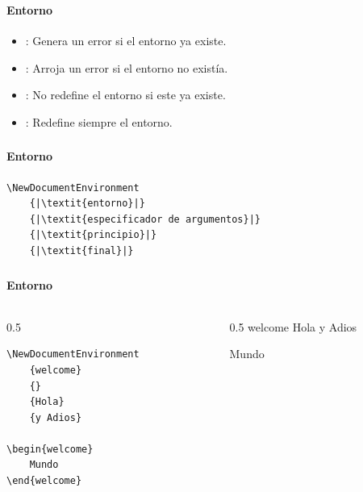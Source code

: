 \documentclass[12pt,aspectratio=169,ignorenonframetext]{ltxbeamer}
\begin{document}
\begin{frame}[fragile]
\frametitle{{\lmr{}}}
\framesubtitle{Entorno}

\begin{itemize}
    \item \texttt{\NewDocumentEnvironment}: Genera un error si el entorno ya existe.
    \item \texttt{\RenewDocumentEnvironment}: Arroja un error si el entorno no existía.
    \item \texttt{\ProvideDocumentEnvironment}: No redefine el entorno si este ya existe.
    \item \texttt{\DeclareDocumentEnvironment}: Redefine siempre el entorno.
\end{itemize}
\end{frame}





\begin{frame}[fragile]
\frametitle{{\lmr{}}}
\framesubtitle{Entorno}

\begin{verbatim}
\NewDocumentEnvironment
    {|\textit{entorno}|}
    {|\textit{especificador de argumentos}|}
    {|\textit{principio}|}
    {|\textit{final}|}
\end{verbatim}
\end{frame}





\begin{frame}[fragile]
\frametitle{{\lmr{}}}
\framesubtitle{Entorno}

\begin{columns}
    \begin{column}{0.5\textwidth}
        \begin{verbatim}
\NewDocumentEnvironment
    {welcome}
    {}
    {Hola}
    {y Adios}

\begin{welcome}
    Mundo
\end{welcome}
        \end{verbatim}
    \end{column}
    {\color{gray} \vline}
    \begin{column}{0.5\linewidth}
        \lmr
        \NewDocumentEnvironment
            {welcome}
            {}
            {Hola}
            {y Adios}

        \begin{welcome}
            Mundo
        \end{welcome}
    \end{column}
\end{columns}
\end{frame}
\end{document}
